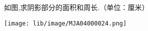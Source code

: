 如图,求阴影部分的面积和周长.（单位：厘米）

\begin{flushright}

    \texttt{[image: lib/image/MJA04000024.png]}

\end{flushright}



